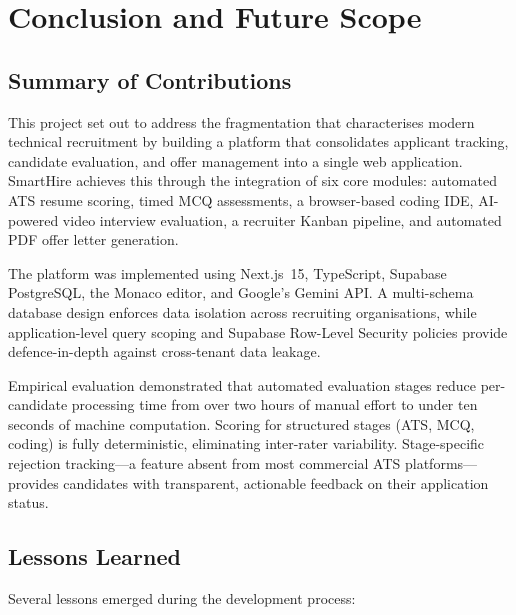\setcounter{chapter}{7}
\chapter{Conclusion and Future Scope}
\label{ch:conclusion}

\section{Summary of Contributions}
\label{sec:summary}

This project set out to address the fragmentation that characterises modern technical recruitment by building a platform that consolidates applicant tracking, candidate evaluation, and offer management into a single web application. SmartHire achieves this through the integration of six core modules: automated ATS resume scoring, timed MCQ assessments, a browser-based coding IDE, AI-powered video interview evaluation, a recruiter Kanban pipeline, and automated PDF offer letter generation.

The platform was implemented using Next.js~15, TypeScript, Supabase PostgreSQL, the Monaco editor, and Google's Gemini API. A multi-schema database design enforces data isolation across recruiting organisations, while application-level query scoping and Supabase Row-Level Security policies provide defence-in-depth against cross-tenant data leakage.

Empirical evaluation demonstrated that automated evaluation stages reduce per-candidate processing time from over two hours of manual effort to under ten seconds of machine computation. Scoring for structured stages (ATS, MCQ, coding) is fully deterministic, eliminating inter-rater variability. Stage-specific rejection tracking---a feature absent from most commercial ATS platforms---provides candidates with transparent, actionable feedback on their application status.

\section{Lessons Learned}
\label{sec:lessons}

Several lessons emerged during the development process:

